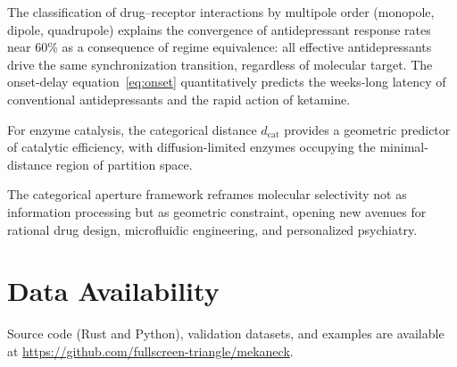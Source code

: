 \documentclass[10pt,twocolumn]{article}
\theoremstyle{definition}
\theoremstyle{remark}
\newcommand{\dcat}{d_{\mathrm{cat}}}
\begin{document}
The classification of drug--receptor interactions by multipole
order (monopole, dipole, quadrupole) explains the convergence
of antidepressant response rates near 60\% as a consequence
of regime equivalence: all effective antidepressants drive the
same synchronization transition, regardless of molecular target.
The onset-delay equation~\eqref{eq:onset} quantitatively predicts
the weeks-long latency of conventional antidepressants and the
rapid action of ketamine.

For enzyme catalysis, the categorical distance $\dcat$ provides
a geometric predictor of catalytic efficiency, with diffusion-limited
enzymes occupying the minimal-distance region of partition space.

The categorical aperture framework reframes molecular selectivity
not as information processing but as geometric constraint,
opening new avenues for rational drug design, microfluidic
engineering, and personalized psychiatry.

\section*{Data Availability}

Source code (Rust and Python), validation datasets, and examples are available at \url{https://github.com/fullscreen-triangle/mekaneck}.



\end{document}
